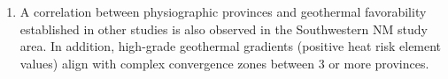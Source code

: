 \begin{enumerate}
    \item A correlation between physiographic provinces and geothermal favorability established in other studies is also observed in the Southwestern NM study area. In addition, high-grade geothermal gradients (positive heat risk element values) align with complex convergence zones between 3 or more provinces.
\end{enumerate}






